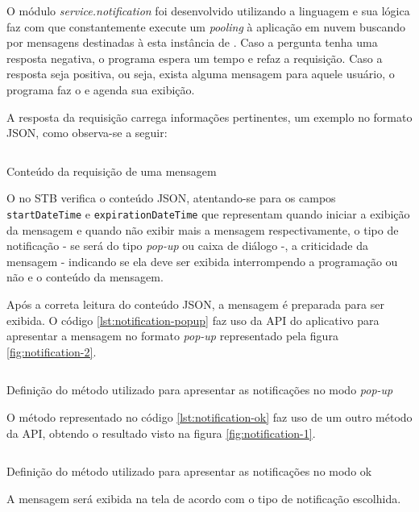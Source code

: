 O módulo \textit{service.notification} foi desenvolvido utilizando a linguagem
\python[] e sua lógica faz com que constantemente execute um \textit{pooling} 
à aplicação em nuvem buscando por mensagens destinadas à esta instância de 
\software. Caso a pergunta tenha uma resposta negativa, o programa espera um 
tempo e refaz a requisição. Caso a resposta seja positiva, ou seja, exista 
alguma mensagem para aquele usuário, o programa faz o \download[] e agenda sua 
exibição. 

A resposta da requisição carrega informações pertinentes, um exemplo no formato
JSON, como observa-se a seguir:

\begin{listing}[ht!]
\inputminted{json}{codigos/message.json}
\caption{Conteúdo da requisição de uma mensagem}
\label{lst:notification-json}
\end{listing}

O \software[] no STB verifica o conteúdo JSON, atentando-se para os campos 
\texttt{startDateTime} e \texttt{expirationDateTime} que representam quando 
iniciar a exibição da mensagem e quando não exibir mais a mensagem 
respectivamente, o tipo de notificação - se será do tipo \textit{pop-up} ou
caixa de diálogo -, a criticidade da mensagem - indicando se ela deve ser
exibida interrompendo a programação ou não e o conteúdo da mensagem. 

Após a correta leitura do conteúdo JSON, a mensagem é preparada para ser 
exibida. O código \ref{lst:notification-popup} faz uso da API do aplicativo
\xbmc[] para apresentar a mensagem no formato \textit{pop-up} representado pela
figura \vref{fig:notification-2}.

\begin{listing}[ht!]
\inputminted{python}{codigos/notification-popup.py}
\caption{Definição do método utilizado para apresentar as notificações no modo
\textit{pop-up}}
\label{lst:notification-popup}
\end{listing}

O método representado no código \ref{lst:notification-ok} faz uso de um outro 
método da API, obtendo o resultado visto na figura \vref{fig:notification-1}.

\begin{listing}[ht!]
\inputminted{python}{codigos/notification-ok.py}
\caption{Definição do método utilizado para apresentar as notificações no modo
ok}
\label{lst:notification-ok}
\end{listing}

A mensagem será exibida na tela de acordo com o tipo de notificação escolhida. 

